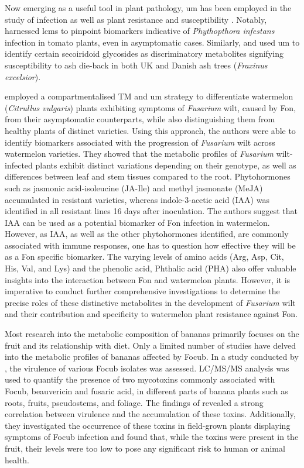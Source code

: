 Now emerging as a useful tool in plant pathology, \acf{um} has been employed in the study of infection as well as plant resistance and susceptibility \parencite{Allwood2021}. Notably, \textcite{Garcia2018} harnessed \acf{lcms} to pinpoint biomarkers indicative of \textit{Phythopthora infestans} infection in tomato plants, even in asymptomatic cases. Similarly, \textcite{Sambles2017} and \textcite{Sidda2020} used \ac{um} to identify certain secoiridoid glycosides as discriminatory metabolites signifying susceptibility to ash die-back in both UK and Danish ash trees (\textit{Fraxinus excelsior}).


\textcite{Kasote2020} employed a compartmentalised TM and \ac{um} strategy to differentiate watermelon (\textit{Citrullus vulgaris}) plants exhibiting symptoms of \textit{Fusarium} wilt, caused by \acf{Fon}, from their asymptomatic counterparts, while also distinguishing them from healthy plants of distinct varieties. Using this approach, the authors were able to identify biomarkers associated with the progression of \textit{Fusarium} wilt across watermelon varieties. They showed that the metabolic profiles of \textit{Fusarium} wilt-infected plants exhibit distinct variations depending on their genotype, as well as differences between leaf and stem tissues compared to the root. Phytohormones such as jasmonic acid-isoleucine (JA-Ile) and methyl jasmonate (MeJA) accumulated in resistant varieties, whereas indole-3-acetic acid (IAA) was identified in all resistant lines 16 days after inoculation. The authors suggest that IAA can be used as a potential biomarker of \ac{Fon} infection in watermelon. However, as IAA, as well as the other phytohormones identified,  are commonly associated with immune responses, one has to question how effective they will be as a \ac{Fon} specific biomarker. The varying levels of amino acids (Arg, Asp, Cit, His, Val, and Lys) and the phenolic acid, Phthalic acid (PHA) also offer valuable insights into the interaction between \ac{Fon} and watermelon plants. However, it is imperative to conduct further comprehensive investigations to determine the precise roles of these distinctive metabolites in the development of \textit{Fusarium} wilt and their contribution and specificity to watermelon plant resistance against \ac{Fon}.

Most research into the metabolic composition of bananas primarily focuses on the fruit and its relationship with diet. Only a limited number of studies have delved into the metabolic profiles of bananas affected by \ac{Focub}. In a study conducted by \textcite{Li2013c}, the virulence of various \ac{Focub} isolates was assessed. LC/MS/MS analysis was used to quantify the presence of two mycotoxins commonly associated with \ac{Focub}, beauvericin and fusaric acid, in different parts of banana plants such as roots, fruits, pseudostems, and foliage. The findings of \textcite{Li2013c} revealed a strong correlation between virulence and the accumulation of these toxins. Additionally, they investigated the occurrence of these toxins in field-grown plants displaying symptoms of \ac{Focub} infection and found that, while the toxins were present in the fruit, their levels were too low to pose any significant risk to human or animal health.

